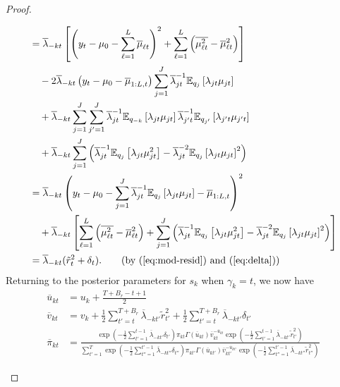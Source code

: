 \begin{proof}
\begin{enumerate}[label=\roman*.]
\begin{align*}
    &= \overline{\lambda}_{-kt}\left[\left(y_t - \mu_0 - \sum_{\ell=1}^L \overline{\mu}_{\ell t}\right)^2 + \sum_{\ell=1}^L \left(\overline{\mu^2_{\ell t}} - \overline{\mu}^2_{\ell t} \right) \right] \\
    &\quad -2  \overline{\lambda}_{-kt}\left(y_t - \mu_0  - \overline{\mu}_{1:L, t}\right) \sum_{j=1}^J \overline{\lambda}_{jt}^{-1} \E_{q_{j}}\left[\lambda_{jt} \mu_{jt}\right] \\
    &\quad + \overline{\lambda}_{-kt} \sum_{j=1}^J\sum_{j'=1}^J \overline{\lambda}_{jt}^{-1}\E_{q_{-k}}\left[\lambda_{jt} \mu_{jt}\right]\overline{\lambda}_{j't}^{-1}\E_{q_{j'}}\left[ \lambda_{j't}\mu_{j't}\right] \\
    &\quad + \overline{\lambda}_{-kt} \sum_{j=1}^J\left(\overline{\lambda}_{jt}^{-1}\E_{q_{j}}\left[ \lambda_{jt}\mu_{jt}^2\right] -\overline{\lambda}_{jt}^{-2}\E_{q_{j}}\left[ \lambda_{jt}\mu_{jt}\right]^2\right) \\
    &=  \overline{\lambda}_{-kt}\left(y_t - \mu_0 - \sum_{j=1}^J \overline{\lambda}_{jt}^{-1} \E_{q_{j}}\left[\lambda_{jt} \mu_{jt}\right] - \overline{\mu}_{1:L, t}\right)^2 \\
    &\quad + \overline{\lambda}_{-kt}\left[\sum_{\ell=1}^L \left(\overline{\mu^2_{\ell t}} - \overline{\mu}^2_{\ell t} \right) + \sum_{j=1}^J\left(\overline{\lambda}_{jt}^{-1}\E_{q_{j}}\left[ \lambda_{jt}\mu_{jt}^2\right] -\overline{\lambda}_{jt}^{-2}\E_{q_{j}}\left[ \lambda_{jt}\mu_{jt}\right]^2\right)\right] \\
    &= \overline{\lambda}_{-kt}(\tilde{r}^2_t + \delta_t). \tag{by (\ref{eq:mod-resid}) and (\ref{eq:delta})} 
\end{align*}
\normalsize
Returning to the posterior parameters for $s_{k}$ when $\gamma_{k}=t$, we now have \:
\begin{align*}
    \overline{u}_{kt} &= u_{k} + \frac{T+B_r-t+1}{2} \\
    \overline{v}_{kt} &= v_{k} + \frac{1}{2}\sum_{t'=t}^{T+B_r}\overline{\lambda}_{-kt'}\tilde{r}^2_{t'} + \frac{1}{2}\sum_{t'=t}^{T+B_r}\overline{\lambda}_{-kt'}\delta_{t'} \\
    \overline{\pi}_{kt}  &= \frac{\exp\left(-\frac{1}{2}\sum_{t'=1}^{t-1}\overline{\lambda}_{-kt'}\delta_{t'}\right)\pi_{kt}\Gamma(\overline{u}_{kt})\overline{v}_{kt}^{-\overline{u}_{kt}}\exp\left( -\frac{1}{2} \sum_{t'=1}^{t-1} \overline{\lambda}_{-kt'}\tilde{r}_{t'}^2 \right)}{\sum_{t'=1}^T \exp\left(-\frac{1}{2}\sum_{t''=1}^{t'-1}\overline{\lambda}_{-kt''}\delta_{t''}\right) \pi_{kt'}\Gamma(\overline{u}_{kt'})\overline{v}_{kt'}^{-\overline{u}_{kt'}}\exp\left( -\frac{1}{2} \sum_{t''=1}^{t'-1} \overline{\lambda}_{-kt''}\tilde{r}_{t''}^2\right)}

\end{align*}
\end{enumerate}
\end{proof}
